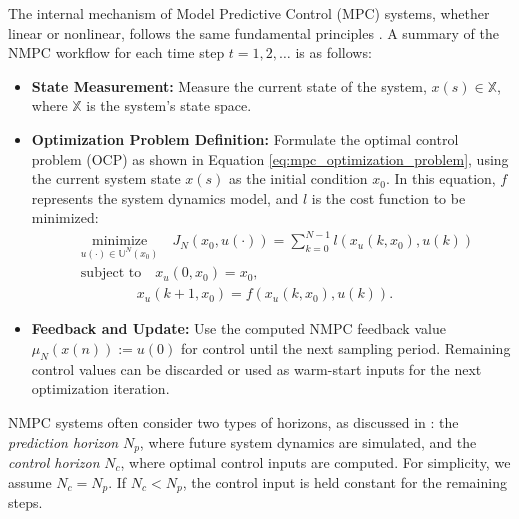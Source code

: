 The internal mechanism of Model Predictive Control (MPC) systems, whether linear or nonlinear, follows the same fundamental principles \cite{grune2017nonlinearmpc,schwenzer2021review}. A summary of the NMPC workflow for each time step \( t = 1, 2, \dots \) is as follows:

\begin{itemize}
    \item \textbf{State Measurement:} Measure the current state of the system, \( x(s) \in \mathbb{X} \), where \( \mathbb{X} \) is the system's state space.
    \item \textbf{Optimization Problem Definition:} Formulate the optimal control problem (OCP) as shown in Equation \ref{eq:mpc_optimization_problem}, using the current system state \( x(s) \) as the initial condition \( x_0 \). In this equation, \( f \) represents the system dynamics model, and \( l \) is the cost function to be minimized:
    \begin{equation}
        \begin{aligned}
            &\underset{u(\cdot) \in  \mathbb{U}^{N}(x_{0})}{\text{minimize}} \quad J_{N}(x_{0}, u(\cdot)) = \sum_{k=0}^{N-1} l(x_u(k, x_0), u(k)) \\
            &\text{subject to} \quad x_u(0, x_0) = x_0, \\
            &\quad \quad \quad \quad x_u(k+1, x_0) = f(x_u(k, x_0), u(k)).
        \end{aligned}
        \label{eq:mpc_optimization_problem}
    \end{equation}
    \item \textbf{Feedback and Update:} Use the computed NMPC feedback value \( \mu_{N}(x(n)) := u(0) \) for control until the next sampling period. Remaining control values can be discarded or used as warm-start inputs for the next optimization iteration.
\end{itemize}

NMPC systems often consider two types of horizons, as discussed in \cite{schwenzer2021review}: the \textit{prediction horizon} \( N_p \), where future system dynamics are simulated, and the \textit{control horizon} \( N_c \), where optimal control inputs are computed. For simplicity, we assume \( N_c = N_p \). If \( N_c < N_p \), the control input is held constant for the remaining steps.
